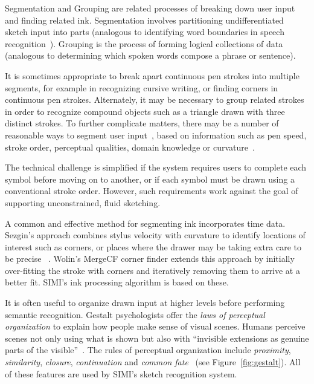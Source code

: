 Segmentation and Grouping are related processes of breaking down user
input and finding related ink. Segmentation involves partitioning
undifferentiated sketch input into parts (analogous to identifying
word boundaries in speech recognition~\cite{cole-survey}). Grouping is
the process of forming logical collections of data (analogous to
determining which spoken words compose a phrase or sentence).

It is sometimes appropriate to break apart continuous pen strokes into
multiple segments, for example in recognizing cursive writing, or
finding corners in continuous pen strokes. Alternately, it may be
necessary to group related strokes in order to recognize compound
objects such as a triangle drawn with three distinct strokes. To
further complicate matters, there may be a number of reasonable ways
to segment user input~\cite{mankoff-burlap}, based on information such
as pen speed, stroke order, perceptual qualities, domain knowledge or
curvature~\cite{kim-segmentation}. 

The technical challenge is simplified if the system requires users to
complete each symbol before moving on to another, or if each symbol
must be drawn using a conventional stroke order. However, such
requirements work against the goal of supporting unconstrained, fluid
sketching.

A common and effective method for segmenting ink incorporates time
data. Sezgin's approach combines stylus velocity with curvature to
identify locations of interest such as corners, or places where the
drawer may be taking extra care to be precise
~\cite{sezgin-early-processing,davis-siggraph-tutorial}. Wolin's
MergeCF corner finder extends this approach by initially over-fitting
the stroke with corners and iteratively removing them to arrive at a
better fit. SIMI's ink processing algorithm is based on these.

It is often useful to organize drawn input at higher levels before
performing semantic recognition.  Gestalt psychologists offer the
\textit{laws of perceptual organization} to explain how people make
sense of visual scenes. Humans perceive scenes not only using what is
shown but also with ``invisible extensions as genuine parts of the
visible''~\cite{arnheim-visthink}. The rules of perceptual
organization include \textit{proximity}, \textit{similarity},
\textit{closure}, \textit{continuation} and \textit{common
  fate}~\cite{kanizsa-gestalt} (see Figure~\ref{fig:gestalt}). All of
these features are used by SIMI's sketch recognition system.

